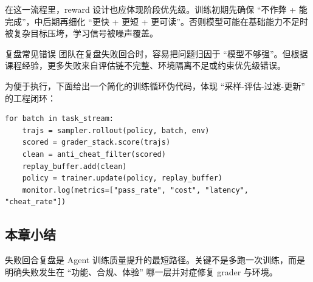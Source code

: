 在这一流程里，reward 设计也应体现阶段优先级。训练初期先确保 ``不作弊 + 能完成''，中后期再细化 ``更快 + 更短 + 更可读''。否则模型可能在基础能力不足时被复杂目标压垮，学习信号被噪声覆盖。

\begin{warningbox}{复盘常见错误}
团队在复盘失败回合时，容易把问题归因于 ``模型不够强''。但根据课程经验，更多失败来自评估链不完整、环境隔离不足或约束优先级错误。
\end{warningbox}

为便于执行，下面给出一个简化的训练循环伪代码，体现 ``采样-评估-过滤-更新'' 的工程闭环：

\begin{lstlisting}[caption={Agent RL 训练循环（简化版）}]
for batch in task_stream:
    trajs = sampler.rollout(policy, batch, env)
    scored = grader_stack.score(trajs)
    clean = anti_cheat_filter(scored)
    replay_buffer.add(clean)
    policy = trainer.update(policy, replay_buffer)
    monitor.log(metrics=["pass_rate", "cost", "latency", "cheat_rate"])
\end{lstlisting}

\subsection{本章小结}
失败回合复盘是 Agent 训练质量提升的最短路径。关键不是多跑一次训练，而是明确失败发生在 ``功能、合规、体验'' 哪一层并对症修复 grader 与环境。

